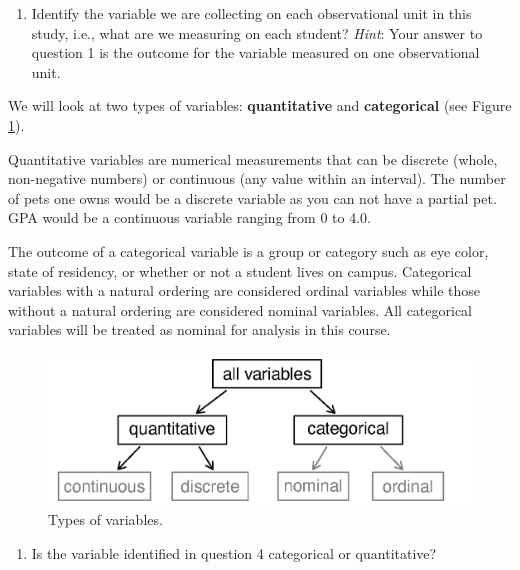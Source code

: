 \documentclass[
]{report}
\providecommand{\tightlist}{%
  \setlength{\itemsep}{0pt}\setlength{\parskip}{0pt}}
\begin{document}
\begin{enumerate}
\def\labelenumi{\arabic{enumi}.}
\setcounter{enumi}{3}
\tightlist
\item
  Identify the variable we are collecting on each observational unit in this study, i.e., what are we measuring on each student? \emph{Hint}: Your answer to question 1 is the outcome for the variable measured on one observational unit.
\end{enumerate}

\vspace{.8in}

We will look at two types of variables: \textbf{quantitative} and \textbf{categorical} (see Figure \ref{fig:types-of-variables}).

Quantitative variables are numerical measurements that can be discrete (whole, non-negative numbers) or continuous (any value within an interval). The number of pets one owns would be a discrete variable as you can not have a partial pet. GPA would be a continuous variable ranging from 0 to 4.0.

The outcome of a categorical variable is a group or category such as eye color, state of residency, or whether or not a student lives on campus. Categorical variables with a natural ordering are considered ordinal variables while those without a natural ordering are considered nominal variables. All categorical variables will be treated as nominal for analysis in this course.

\begin{figure}

{\centering \includegraphics[width=0.5\linewidth]{images/variables} 

}

\caption{Types of variables.}\label{fig:types-of-variables}
\end{figure}

\begin{enumerate}
\def\labelenumi{\arabic{enumi}.}
\setcounter{enumi}{4}
\tightlist
\item
  Is the variable identified in question 4 categorical or quantitative?
\end{enumerate}

\vspace{0.3in}
\end{document}
